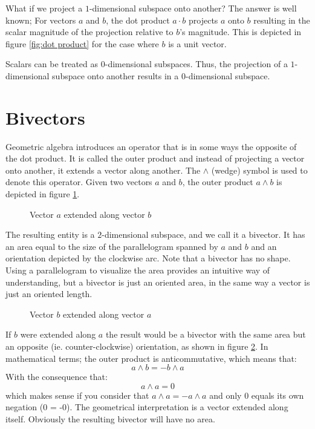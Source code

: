 \documentclass[10pt]{report}
\begin{document}
What if we project a $1$-dimensional subspace onto another? The
answer is well known; For vectors $a$ and $b$, the dot product
$a\cdot b$ projects $a$ onto $b$ resulting in the scalar magnitude
of the projection relative to $b$'s magnitude. This is depicted in
figure \ref{fig:dot product} for the case where $b$ is a unit
vector.

Scalars can be treated as $0$-dimensional subspaces. Thus, the
projection of a $1$-dimensional subspace onto another results in a
$0$-dimensional subspace.

\section{Bivectors}

Geometric algebra introduces an operator that is in some ways the
opposite of the dot product. It is called the outer product and
instead of projecting a vector onto another, it extends a vector
along another. The $\wedge$ (wedge) symbol is used to denote this
operator. Given two vectors $a$ and $b$, the outer product
$a\wedge b$ is depicted in figure \ref{fig:outer_product_a}.

\begin{figure}[ht]
\centering

\caption{Vector $a$ extended along vector $b$}
\label{fig:outer_product_a}
\end{figure}

The resulting entity is a $2$-dimensional subspace, and we call it
a bivector. It has an area equal to the size of the parallelogram
spanned by $a$ and $b$ and an orientation depicted by the
clockwise arc. Note that a bivector has no shape. Using a
parallelogram to visualize the area provides an intuitive way of
understanding, but a bivector is just an oriented area, in the
same way a vector is just an oriented length.

\begin{figure}[ht]
\centering

\caption{Vector $b$ extended along vector $a$}
\label{fig:outer_product_b}
\end{figure}

If $b$ were extended along $a$ the result would be a bivector with
the same area but an opposite (ie. counter-clockwise) orientation,
as shown in figure \ref{fig:outer_product_b}. In mathematical
terms; the outer product is anticommutative, which means that:
\begin{equation}
\label{eq:outer prod anticommutative}
    a\wedge b = -b\wedge a
\end{equation}
With the consequence that:
\begin{equation}
\label{eq:outer prod self zero}
    a\wedge a = 0
\end{equation}
which makes sense if you consider that $a\wedge a = -a\wedge a$
and only $0$ equals its own negation (0 = -0). The geometrical
interpretation is a vector extended along itself. Obviously the
resulting bivector will have no area.
\end{document}
